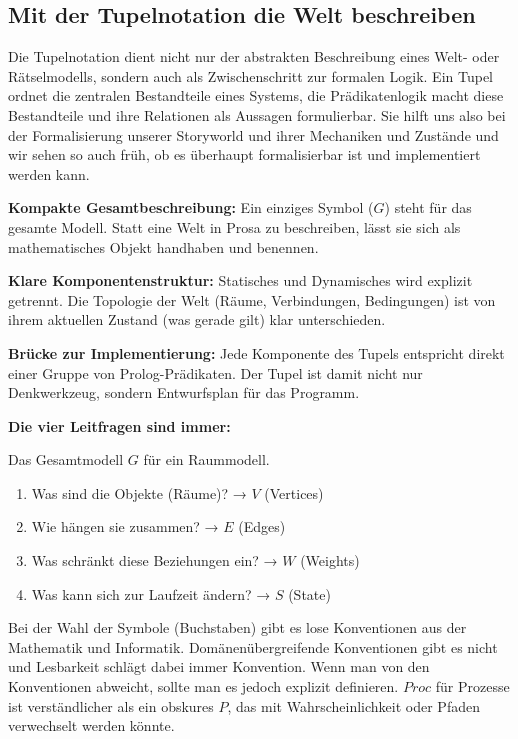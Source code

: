 \documentclass[parskip=half,a4paper,11pt]{scrreprt}
\begin{document}
\subsection{Mit der Tupelnotation die Welt beschreiben}

Die Tupelnotation dient nicht nur der abstrakten Beschreibung eines Welt- oder Rätselmodells, sondern auch als Zwischenschritt zur formalen Logik. Ein Tupel ordnet die zentralen Bestandteile eines Systems, die Prädikatenlogik macht diese Bestandteile und ihre Relationen als Aussagen formulierbar. Sie hilft uns also bei der Formalisierung unserer Storyworld und ihrer Mechaniken und Zustände und wir sehen so auch früh, ob es überhaupt formalisierbar ist und implementiert werden kann.

\textbf{Kompakte Gesamtbeschreibung:} Ein einziges Symbol ($G$) steht für das gesamte Modell. Statt eine Welt in Prosa zu beschreiben, lässt sie sich als mathematisches Objekt handhaben und benennen.

\textbf{Klare Komponentenstruktur:} Statisches und Dynamisches wird explizit getrennt. Die Topologie der Welt (Räume, Verbindungen, Bedingungen) ist von ihrem aktuellen Zustand (was gerade gilt) klar unterschieden.

\textbf{Brücke zur Implementierung:} Jede Komponente des Tupels entspricht direkt einer Gruppe von Prolog-Prädikaten. Der Tupel ist damit nicht nur Denkwerkzeug, sondern Entwurfsplan für das Programm.

\textbf{Die vier Leitfragen sind immer:}

Das Gesamtmodell $G$ für ein Raummodell.

\begin{enumerate}
    \item Was sind die Objekte (Räume)? → $V$ (Vertices)
    \item Wie hängen sie zusammen? → $E$ (Edges)
    \item Was schränkt diese Beziehungen ein? → $W$ (Weights)
    \item Was kann sich zur Laufzeit ändern? → $S$ (State)
\end{enumerate}

Bei der Wahl der Symbole (Buchstaben) gibt es lose Konventionen aus der Mathematik und Informatik. Domänenübergreifende Konventionen gibt es nicht und Lesbarkeit schlägt dabei immer Konvention. Wenn man von den Konventionen abweicht, sollte man es jedoch explizit definieren. $Proc$ für Prozesse ist verständlicher als ein obskures $P$, das mit Wahrscheinlichkeit oder Pfaden verwechselt werden könnte.
\end{document}
